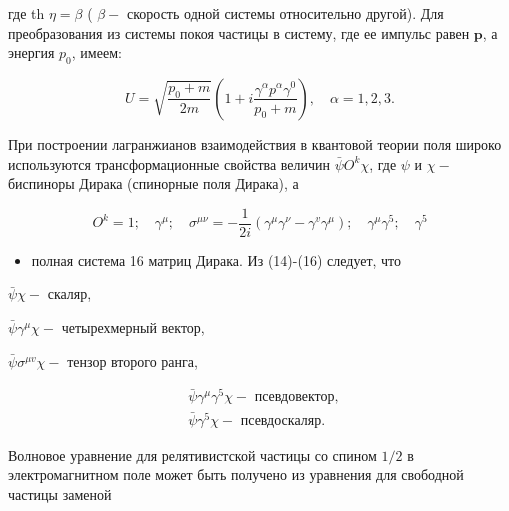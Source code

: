 \documentclass[10pt]{article}
\begin{document}
где th $\eta=\beta$ ( $\beta-$ скорость одной системы относительно другой). Для преобразования из системы покоя частицы в систему, где ее импульс равен $\boldsymbol{p}$, а энергия $p_{0}$, имеем:



\[

U=\sqrt{\frac{p_{0}+m}{2 m}}\left(1+i \frac{\gamma^{\alpha} p^{\alpha} \gamma^{0}}{p_{0}+m}\right), \quad \alpha=1,2,3 .

\]



При построении лагранжианов взаимодействия в квантовой теории поля широко используются трансформационные свойства величин $\bar{\psi} O^{k} \chi$, где $\psi$ и $\chi-$ биспиноры Дирака (спинорные поля Дирака), а



\[

O^{k}=1 ; \quad \gamma^{\mu} ; \quad \sigma^{\mu \nu}=-\frac{1}{2 i}\left(\gamma^{\mu} \gamma^{\nu}-\gamma^{v} \gamma^{\mu}\right) ; \quad \gamma^{\mu} \gamma^{5} ; \quad \gamma^{5}

\]



\begin{itemize}

  \item полная система 16 матриц Дирака. Из (14)-(16) следует, что

\end{itemize}



$\bar{\psi} \chi-$ скаляр,



$\bar{\psi} \gamma^{\mu} \chi-$ четырехмерный вектор,



$\bar{\psi} \sigma^{\mu v} \chi-$ тензор второго ранга,



\[

\begin{aligned}

& \bar{\psi} \gamma^{\mu} \gamma^{5} \chi-\text { псевдовектор, } \\

& \bar{\psi} \gamma^{5} \chi-\text { псевдоскаляр. }

\end{aligned}

\]



Волновое уравнение для релятивистской частицы со спином $1 / 2$ в электромагнитном поле может быть получено из уравнения для свободной частицы заменой
\end{document}
